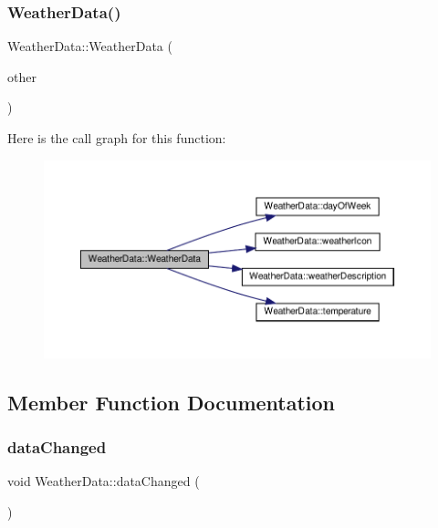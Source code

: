 \subsubsection{\texorpdfstring{Weather\+Data()}{WeatherData()}\hspace{0.1cm}{\footnotesize\ttfamily [2/2]}}
{\footnotesize\ttfamily Weather\+Data\+::\+Weather\+Data (\begin{DoxyParamCaption}\item[{const \hyperlink{class_weather_data}{Weather\+Data} \&}]{other }\end{DoxyParamCaption})}

Here is the call graph for this function\+:\nopagebreak
\begin{figure}[H]
\begin{center}
\leavevmode
\includegraphics[width=350pt]{class_weather_data_a48baeaa6b2a77d2a5e008159188416e8_cgraph}
\end{center}
\end{figure}


\subsection{Member Function Documentation}
\mbox{\label{class_weather_data_a23185106cf22ef8c57c96154e37b24d1}} 
\subsubsection{\texorpdfstring{data\+Changed}{dataChanged}}
{\footnotesize\ttfamily void Weather\+Data\+::data\+Changed (\begin{DoxyParamCaption}{ }\end{DoxyParamCaption})\hspace{0.3cm}{\ttfamily [signal]}}

